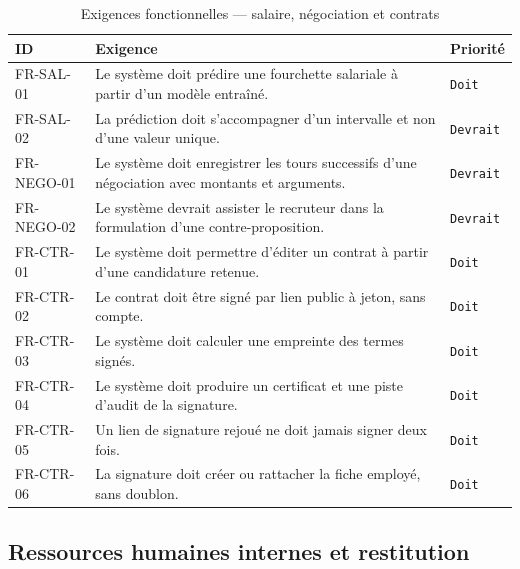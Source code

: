 \begin{table}[htbp]
  \centering
  \caption{Exigences fonctionnelles — salaire, négociation et contrats}
  \label{tab:fr_contracts}
  \begin{tabularx}{\textwidth}{L{2.4cm} X L{1.9cm}}
    \toprule
    \textbf{ID} & \textbf{Exigence} & \textbf{Priorité} \\
    \midrule
    FR-SAL-01  & Le système doit prédire une fourchette salariale à partir d'un modèle entraîné. & \texttt{Doit} \\
    FR-SAL-02  & La prédiction doit s'accompagner d'un intervalle et non d'une valeur unique. & \texttt{Devrait} \\
    FR-NEGO-01 & Le système doit enregistrer les tours successifs d'une négociation avec montants et arguments. & \texttt{Devrait} \\
    FR-NEGO-02 & Le système devrait assister le recruteur dans la formulation d'une contre-proposition. & \texttt{Devrait} \\
    FR-CTR-01  & Le système doit permettre d'éditer un contrat à partir d'une candidature retenue. & \texttt{Doit} \\
    FR-CTR-02  & Le contrat doit être signé par lien public à jeton, sans compte. & \texttt{Doit} \\
    FR-CTR-03  & Le système doit calculer une empreinte des termes signés. & \texttt{Doit} \\
    FR-CTR-04  & Le système doit produire un certificat et une piste d'audit de la signature. & \texttt{Doit} \\
    FR-CTR-05  & Un lien de signature rejoué ne doit jamais signer deux fois. & \texttt{Doit} \\
    FR-CTR-06  & La signature doit créer ou rattacher la fiche employé, sans doublon. & \texttt{Doit} \\
    \bottomrule
  \end{tabularx}
\end{table}

\subsection{Ressources humaines internes et restitution}
\label{sec:fr_hr}

